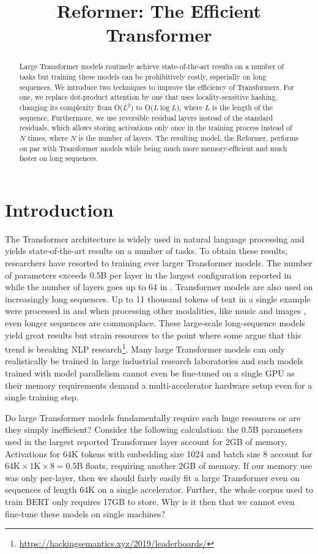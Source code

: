 \title{Reformer: The Efficient Transformer}

\begin{abstract}
Large Transformer models routinely achieve state-of-the-art results on a number of tasks but training these models can be prohibitively costly, especially on long sequences. We introduce two techniques to improve the efficiency of Transformers. For one, we replace dot-product attention by one that uses locality-sensitive hashing, changing its complexity from O($L^2$) to O($L\log L$), where $L$ is the length of the sequence. Furthermore, we use reversible residual layers instead of the standard residuals, which allows storing activations only once in the training process instead of $N$ times, where $N$ is the number of layers. The resulting model, the Reformer, performs on par with Transformer models while being much more memory-efficient and much faster on long sequences.
\end{abstract}

\section{Introduction}

The Transformer architecture \citep{transformer} is widely used in natural language processing and yields state-of-the-art results on a number of tasks. To obtain these results, researchers have resorted to training ever larger Transformer models. The number of parameters exceeds 0.5B per layer in the largest configuration reported in \citep{meshtf} while the number of layers goes up to 64 in \citep{chartransformer}. Transformer models are also used on increasingly long sequences. Up to 11 thousand tokens of text in a single example were processed in \citep{wikipedia} and when processing other modalities, like music \citep{huang2018music} and images \citep{parmar2018imagetransformer}, even longer sequences are commonplace. These large-scale long-sequence models yield great results but strain resources to the point where some argue that this trend is breaking NLP
research\footnote{\url{https://hackingsemantics.xyz/2019/leaderboards/}}.
Many large Transformer models can only realistically be trained in large industrial research laboratories and such models trained with model parallelism cannot even be fine-tuned on a single GPU as their memory requirements demand a multi-accelerator hardware setup even for a single training step.

Do large Transformer models fundamentally require such huge resources or are they simply inefficient? Consider the following calculation: the 0.5B parameters used in the largest reported Transformer layer account for 2GB of memory. Activations for 64K tokens with embedding size 1024 and batch size 8 account for $64\text{K} \times 1\text{K} \times 8 = 0.5$B floats, requiring another 2GB of memory. If our memory use was only per-layer, then we should fairly easily fit a large Transformer even on sequences of length 64K on a single accelerator. Further, the whole corpus used to train BERT only requires 17GB to store. Why is it then that we cannot even fine-tune these models on single machines?

